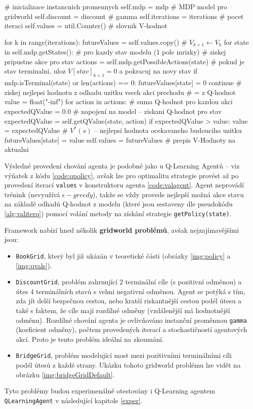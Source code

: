 \begin{python}[label={code:valagent}]
# inicializace instancnich promennych
self.mdp = mdp			# MDP model pro gridworld
self.discount = discount     # gamma
self.iterations = iterations # pocet iteraci
self.values = util.Counter() # slovnik V-hodnot

for k in range(iterations):
   futureValues = self.values.copy()   # $V_{k+1} \leftarrow V_k$
   for state in self.mdp.getStates():  # pro kazdy stav modelu (1 pole mrizky)
      # ziskej pripustne akce pro stav
      actions = self.mdp.getPossibleActions(state)
      # pokud je stav terminalni, uloz $V[stav]_{k+1} = 0$ a pokracuj na novy stav
      if mdp.isTerminal(state) or len(actions) == 0:
         futureValues[state] = 0
         continue
      # ziskej nejlepsi hodnotu z odhadu uzitku vsech akci prechodu
      # = z Q-hodnot
      value = float("-inf")
      for action in actions:
         # suma Q-hodnot pro kazdou akci
         expectedQValue = 0.0
         # napojení na model -- ziskani Q-hodnot pro stav
         expectedQValue = self.getQValue(state, action)
         if expectedQValue > value:
            value = expectedQValue
      # $V^*(s)$ -- nejlepsi hodnota ocekavaneho budouciho uzitku
      futureValues[state] = value
   self.values = futureValues # prepis V-Hodnoty na aktualni
\end{python}

Výsledné provedení chování agenta je podobné jako u Q-Learning Agentů -- viz výňatek z kódu \ref{code:qpolicy}, avšak lze pro optimalitu strategie provést až po provedení iterací \texttt{values} v konstruktoru agenta \ref{code:valagent}. Agent neprovádí trénink (nevyužívá $\epsilon-greedy$), takže se vždy provede nejlepší možná akce stavu na základě odhadů Q-hodnot z modelu (které jsou sestaveny dle pseudokódu \ref{alg:valiterq}) pomocí volání metody na získání strategie \texttt{getPolicy(state)}.

Framework nabízí hned několik \textbf{gridworld problémů}, avšak nejzajímavějšími jsou:
\begin{itemize}
  \item \texttt{BookGrid}, který byl již ukázán v teoretické části (obrázky \ref{img:policy} a \ref{img:qvals}).
  \item \texttt{DiscountGrid}, problém zahrnující 2 terminální cíle (s pozitivní odměnou) a útes 4 terminálních stavů s velmi negativní odměnou. Agent se potýká s tím, zda jít delší bezpečnou cestou, nebo kratší riskantnější cestou podél útesu a také s faktem, že cíle mají rozdílné odměny (vzdálenější má hodnotnější odměnu). Rozdílné chování agenta je ovlivňováno instanční proměnnou \texttt{gamma} (koeficient odměny), počtem provedených iterací a stochastičností agentových akcí. Proto je tento problém ideální na zkoumání.
  \item \texttt{BridgeGrid}, problém modelující most mezi pozitivními terminálními cíli podél útesů z každé strany. Ukázku tohoto gridworld problému lze vidět na obrázku \ref{img:bridgeGridDefault}.
\end{itemize}
Tyto problémy budou experimenálně otestovány i Q-Learning agentem \texttt{QLearningAgent} v následující kapitole \ref{exper}.

